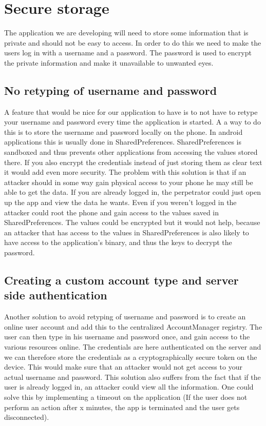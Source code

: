 \section{Secure storage}
The application we are developing will need to store some information that is private and should not be easy to access. In order to do this we need to make the users log in with a username and a password. The password is used to encrypt the private information and make it unavailable to unwanted eyes.  

\subsection{No retyping of username and password}
A feature that would be nice for our application to have is to not have to retype your username and password every time the application is started.
\newline
\newline
A a way to do this is to store the username and password locally on the phone. In android applications this is usually done in SharedPreferences. SharedPreferences is sandboxed and thus prevents other applications from accessing the values stored there. If you also encrypt the credentials instead of just storing them as clear text it would add even more security.
\newline
\newline
The problem with this solution is that if an attacker should in some way gain physical access to your phone he may still be able to get the data. If you are already logged in, the perpetrator could just open up the app and view the data he wants. Even if you weren’t logged in the attacker could root the phone and gain access to the values saved in SharedPreferences. The values could be encrypted but it would not help, because an attacker that has access to the values in SharedPreferences is also likely to have access to the application’s binary, and thus the keys to decrypt the password.


\subsection{Creating a custom account type and server side authentication}
Another solution to avoid retyping of username and password is to create an online user account and add this to the centralized AccountManager registry. The user can then type in his username and password once, and gain access to the various resources online. The credentials are here authenticated on the server and we can therefore store the credentials as a cryptographically secure token on the device. This would make sure that an attacker would not get access to your actual username and password.
\newline
\newline
This solution also suffers from the fact that if the user is already logged in, an attacker could view all the information. One could solve this by implementing a timeout on the application (If the user does not perform an action after x minutes, the app is terminated and the user gets disconnected).

